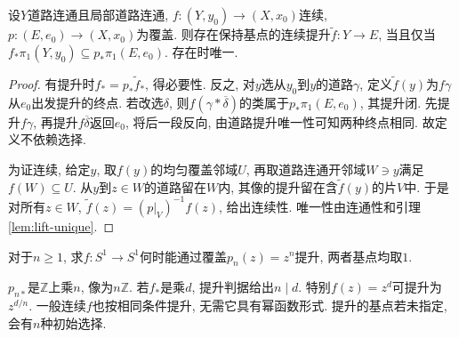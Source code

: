 \begin{theorem}[提升判据]\label{thm:map-lifting}
设$Y$道路连通且局部道路连通, $f:(Y,y_0)\to(X,x_0)$连续, $p:(E,e_0)\to(X,x_0)$为覆盖. 则存在保持基点的连续提升$\widetilde f:Y\to E$, 当且仅当$f_*\pi_1(Y,y_0)\subseteq p_*\pi_1(E,e_0)$. 存在时唯一.
\end{theorem}
\begin{proof}
有提升时$f_*=p_*\widetilde f_*$, 得必要性. 反之, 对$y$选从$y_0$到$y$的道路$\gamma$, 定义$\widetilde f(y)$为$f\gamma$从$e_0$出发提升的终点. 若改选$\delta$, 则$f(\gamma*\overline\delta)$的类属于$p_*\pi_1(E,e_0)$, 其提升闭. 先提升$f\gamma$, 再提升$f\overline\delta$返回$e_0$, 将后一段反向, 由道路提升唯一性可知两种终点相同. 故定义不依赖选择.

为证连续, 给定$y$, 取$f(y)$的均匀覆盖邻域$U$, 再取道路连通开邻域$W\ni y$满足$f(W)\subseteq U$. 从$y$到$z\in W$的道路留在$W$内, 其像的提升留在含$\widetilde f(y)$的片$V$中. 于是对所有$z\in W$, $\widetilde f(z)=(p|_V)^{-1}f(z)$, 给出连续性. 唯一性由连通性和引理\ref{lem:lift-unique}.
\end{proof}

\begin{example}
对于$n\ge1$, 求$f:S^1\to S^1$何时能通过覆盖$p_n(z)=z^n$提升, 两者基点均取$1$.
\end{example}
\begin{solution}
$p_{n*}$是$\mathbb Z$上乘$n$, 像为$n\mathbb Z$. 若$f_*$是乘$d$, 提升判据给出$n\mid d$. 特别$f(z)=z^d$可提升为$z^{d/n}$. 一般连续$f$也按相同条件提升, 无需它具有幂函数形式. 提升的基点若未指定, 会有$n$种初始选择.
\end{solution}

